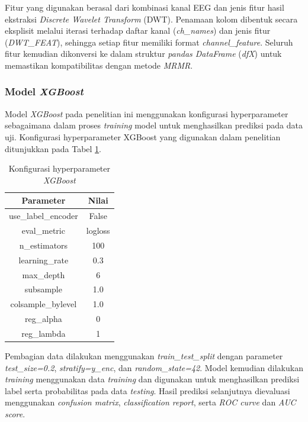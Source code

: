Fitur yang digunakan berasal dari kombinasi kanal EEG dan jenis fitur hasil ekstraksi \textit{Discrete Wavelet Transform} (DWT). Penamaan kolom dibentuk secara eksplisit melalui iterasi terhadap daftar kanal (\textit{ch\_names}) dan jenis fitur (\textit{DWT\_FEAT}), sehingga setiap fitur memiliki format \textit{channel\_feature}. Seluruh fitur kemudian dikonversi ke dalam struktur \textit{pandas DataFrame} (\textit{dfX}) untuk memastikan kompatibilitas dengan metode \textit{MRMR}.

\subsubsection{Model \textit{XGBoost}}


Model \textit{XGBoost} pada penelitian ini menggunakan konfigurasi hyperparameter sebagaimana  dalam proses \textit{training} model untuk menghasilkan prediksi pada data uji. Konfigurasi hyperparameter XGBoost yang digunakan dalam penelitian ditunjukkan pada Tabel \ref{tab:xgboost_hyperparameter}.

\begin{table}[h]
\centering
\caption{Konfigurasi hyperparameter \textit{XGBoost}}
\label{tab:xgboost_hyperparameter}
\begin{tabular}{|c|c|}
\hline
\textbf{Parameter} & \textbf{Nilai} \\
\hline
use\_label\_encoder & False \\
\hline
eval\_metric & logloss \\
\hline
n\_estimators & 100 \\
\hline
learning\_rate & 0.3 \\
\hline
max\_depth & 6 \\
\hline
subsample & 1.0 \\
\hline
colsample\_bylevel & 1.0 \\
\hline
reg\_alpha & 0 \\
\hline
reg\_lambda & 1 \\
\hline
\end{tabular}
\end{table}

Pembagian data dilakukan menggunakan \textit{train\_test\_split} dengan parameter \textit{test\_size=0.2}, \textit{stratify=y\_enc}, dan \textit{random\_state=42}. Model kemudian dilakukan \textit{training} menggunakan data \textit{training} dan digunakan untuk menghasilkan prediksi label serta probabilitas pada data \textit{testing}. Hasil prediksi selanjutnya dievaluasi menggunakan \textit{confusion matrix}, \textit{classification report}, serta \textit{ROC curve} dan \textit{AUC score}.

